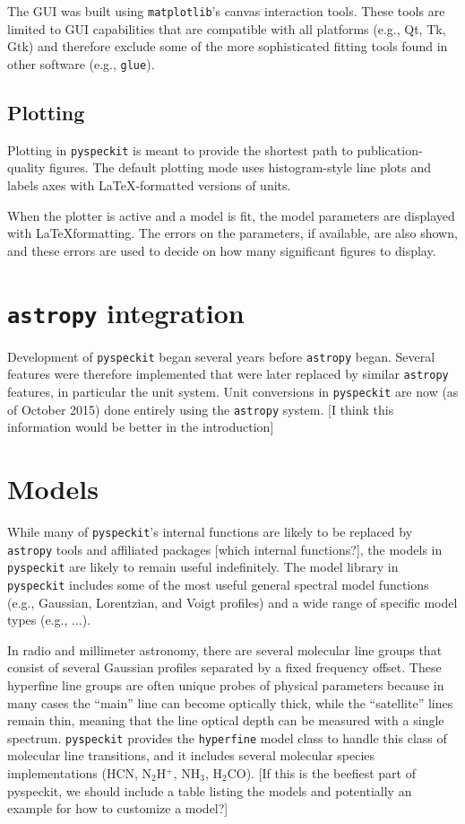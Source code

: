\documentclass[twocolumn]{aastex61}
\newcommand{\pyspeckit}{\texttt{pyspeckit}\xspace}
\newcommand{\astropy}{\texttt{astropy}\xspace}
\begin{document}
The GUI was built using \texttt{matplotlib}'s canvas interaction tools.  These
tools are limited to GUI capabilities that are compatible with all platforms
(e.g., Qt, Tk, Gtk) and therefore exclude some of the more sophisticated fitting
tools found in other software (e.g., \texttt{glue}).

\subsection{Plotting}
Plotting in \pyspeckit is meant to provide the shortest path to
publication-quality figures.  The default plotting mode uses histogram-style
line plots and labels axes with \LaTeX-formatted versions of units.

When the plotter is active and a model is fit, the model parameters are
displayed with \LaTeX formatting.  The errors on the parameters, if available,
are also shown, and these errors are used to decide on how many significant
figures to display.

\section{\astropy integration}
Development of \pyspeckit began several years before \astropy began.  Several
features were therefore implemented that were later replaced by similar
\astropy features, in particular the unit system.  Unit conversions in
\pyspeckit are now (as of October 2015) done entirely using the \astropy
system. [I think this information would be better in the introduction]

\section{Models}
While many of \pyspeckit's internal functions are likely to be replaced by
\astropy tools and affiliated packages [which internal functions?], the models in \pyspeckit are likely to
remain useful indefinitely.  The model library in \pyspeckit includes some of
the most useful general spectral model functions (e.g., Gaussian, Lorentzian,
and Voigt profiles) and a wide range of specific model types (e.g., ...).

In radio and millimeter astronomy, there are several molecular line groups that
consist of several Gaussian profiles separated by a fixed frequency offset.
These hyperfine line groups are often unique probes of physical parameters
because in many cases the ``main'' line can become optically thick, while the
``satellite'' lines remain thin, meaning that the line optical depth can be
measured with a single spectrum.  \pyspeckit provides the \texttt{hyperfine}
model class to handle this class of molecular line transitions, and it includes
several molecular species implementations (HCN, N$_2$H$^+$, NH$_3$,
H$_2$CO). [If this is the beefiest part of pyspeckit, we should include a table
listing the models and potentially an example for how to customize a model?]
\end{document}
